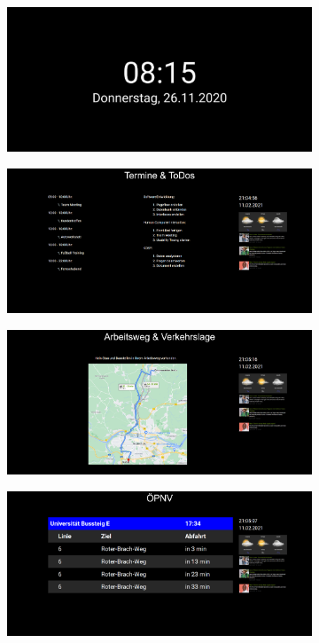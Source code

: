 \documentclass[12pt, a4paper]{scrartcl}
\begin{document}
	\begin{figure}[h!]
		\begin{subfigure}{0.5\textwidth}
			\centering
			\includegraphics[width = 0.8\linewidth]{img/standby.png}
		\end{subfigure}
	\begin{subfigure}{0.5\textwidth}
	\centering
	\includegraphics[width = 0.8\linewidth]{img/TermineToDo.png}
	\end{subfigure}
	\end{figure}	\begin{figure}[h!]
	\begin{subfigure}{0.5\textwidth}
		\centering
		\includegraphics[width = 0.8\linewidth]{img/Arbeitsweg.png}
	\end{subfigure}
	\begin{subfigure}{0.5\textwidth}
		\centering
		\includegraphics[width = 0.8\linewidth]{img/bus.png}
	\end{subfigure}
	\end{figure}	
\end{document}
